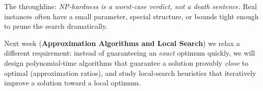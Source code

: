 \documentclass[11pt]{article}
\begin{document}
The throughline: \emph{NP-hardness is a worst-case verdict, not a death
sentence.} Real instances often have a small parameter, special structure, or
bounds tight enough to prune the search dramatically.

Next week (\textbf{Approximation Algorithms and Local Search}) we relax a
different requirement: instead of guaranteeing an \emph{exact} optimum quickly,
we will design polynomial-time algorithms that guarantee a solution provably
\emph{close} to optimal (approximation ratios), and study local-search
heuristics that iteratively improve a solution toward a local optimum.
\end{document}
